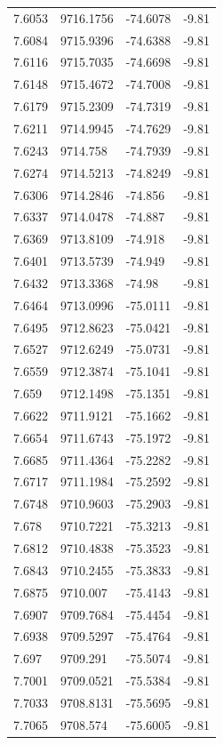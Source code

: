 \begin{table}[H]
\begin{tabular}{llll}
7.6053 & 9716.1756 & -74.6078 & -9.81 \\
7.6084 & 9715.9396 & -74.6388 & -9.81 \\
7.6116 & 9715.7035 & -74.6698 & -9.81 \\
7.6148 & 9715.4672 & -74.7008 & -9.81 \\
7.6179 & 9715.2309 & -74.7319 & -9.81 \\
7.6211 & 9714.9945 & -74.7629 & -9.81 \\
7.6243 & 9714.758 & -74.7939 & -9.81 \\
7.6274 & 9714.5213 & -74.8249 & -9.81 \\
7.6306 & 9714.2846 & -74.856 & -9.81 \\
7.6337 & 9714.0478 & -74.887 & -9.81 \\
7.6369 & 9713.8109 & -74.918 & -9.81 \\
7.6401 & 9713.5739 & -74.949 & -9.81 \\
7.6432 & 9713.3368 & -74.98 & -9.81 \\
7.6464 & 9713.0996 & -75.0111 & -9.81 \\
7.6495 & 9712.8623 & -75.0421 & -9.81 \\
7.6527 & 9712.6249 & -75.0731 & -9.81 \\
7.6559 & 9712.3874 & -75.1041 & -9.81 \\
7.659 & 9712.1498 & -75.1351 & -9.81 \\
7.6622 & 9711.9121 & -75.1662 & -9.81 \\
7.6654 & 9711.6743 & -75.1972 & -9.81 \\
7.6685 & 9711.4364 & -75.2282 & -9.81 \\
7.6717 & 9711.1984 & -75.2592 & -9.81 \\
7.6748 & 9710.9603 & -75.2903 & -9.81 \\
7.678 & 9710.7221 & -75.3213 & -9.81 \\
7.6812 & 9710.4838 & -75.3523 & -9.81 \\
7.6843 & 9710.2455 & -75.3833 & -9.81 \\
7.6875 & 9710.007 & -75.4143 & -9.81 \\
7.6907 & 9709.7684 & -75.4454 & -9.81 \\
7.6938 & 9709.5297 & -75.4764 & -9.81 \\
7.697 & 9709.291 & -75.5074 & -9.81 \\
7.7001 & 9709.0521 & -75.5384 & -9.81 \\
7.7033 & 9708.8131 & -75.5695 & -9.81 \\
7.7065 & 9708.574 & -75.6005 & -9.81 \\

\end{tabular}
\end{table}
